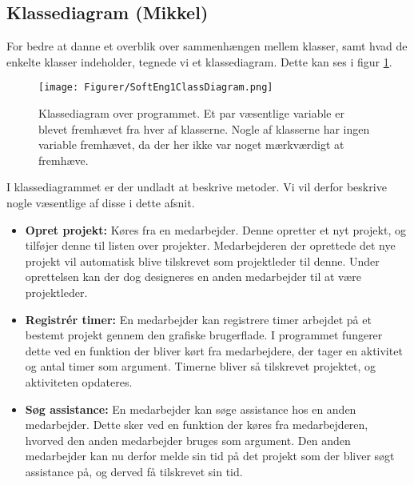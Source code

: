 \subsection{Klassediagram (Mikkel)}

For bedre at danne et overblik over sammenhængen mellem klasser, samt hvad de enkelte klasser indeholder, tegnede vi et klassediagram. Dette kan ses i figur \ref{fig:classDiagram}.

\begin{figure}[H]
    \centering
    \texttt{[image: Figurer/SoftEng1ClassDiagram.png]}
    \caption{Klassediagram over programmet. Et par væsentlige variable er blevet fremhævet fra hver af klasserne. Nogle af klasserne har ingen variable fremhævet, da der her ikke var noget mærkværdigt at fremhæve.}
    \label{fig:classDiagram}
\end{figure}

I klassediagrammet er der undladt at beskrive metoder. Vi vil derfor beskrive nogle væsentlige af disse i dette afsnit.
\begin{itemize}
    \item \textbf{Opret projekt:} Køres fra en medarbejder. Denne opretter et nyt projekt, og tilføjer denne til listen over projekter. Medarbejderen der oprettede det nye projekt vil automatisk blive tilskrevet som projektleder til denne. Under oprettelsen kan der dog designeres en anden medarbejder til at være projektleder.
    
    \item \textbf{Registrér timer:} En medarbejder kan registrere timer arbejdet på et bestemt projekt gennem den grafiske brugerflade. I programmet fungerer dette ved en funktion der bliver kørt fra medarbejdere, der tager en aktivitet og antal timer som argument. Timerne bliver så tilskrevet projektet, og aktiviteten opdateres.
    
    \item \textbf{Søg assistance:} En medarbejder kan søge assistance hos en anden medarbejder. Dette sker ved en funktion der køres fra medarbejderen, hvorved den anden medarbejder bruges som argument. Den anden medarbejder kan nu derfor melde sin tid på det projekt som der bliver søgt assistance på, og derved få tilskrevet sin tid.
    
\end{itemize}